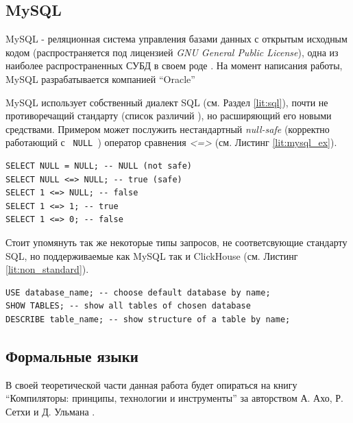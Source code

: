 \subsection{MySQL} \label{lit:mysql}
MySQL - реляционная система управления базами данных с открытым исходным кодом (распространяется под лицензией \textit{GNU General Public License}), одна из наиболее распространенных СУБД в своем роде \cite{mysql_ref}. На момент написания работы, MySQL разрабатывается компанией \enquote{Oracle} 

MySQL использует собственный диалект SQL (см. Раздел \ref{lit:sql}), почти не противоречащий стандарту (список различий \cite{mysql_vs_sql}\cite{mysql_vs_sql2}), но расширяющий его новыми средствами. Примером может послужить нестандартный \textit{null-safe} (корректно работающий с \texttt{ NULL }) оператор сравнения \textit{<=>} (см. Листинг \ref{lit:mysql_ex}).

\begin{code}
    \label{lit:mysql_ex}
    \begin{verbatim}
SELECT NULL = NULL; -- NULL (not safe)
SELECT NULL <=> NULL; -- true (safe)
SELECT 1 <=> NULL; -- false
SELECT 1 <=> 1; -- true
SELECT 1 <=> 0; -- false
    \end{verbatim}
\end{code}

Стоит упомянуть так же некоторые типы запросов, не соответсвующие стандарту SQL, но поддерживаемые как MySQL так и ClickHouse (см. Листинг \ref{lit:non_standard}).

\begin{code}
    \label{lit:non_standard}
    \begin{verbatim}
USE database_name; -- choose default database by name;
SHOW TABLES; -- show all tables of chosen database
DESCRIBE table_name; -- show structure of a table by name;
    \end{verbatim}
\end{code}


\subsection{Формальные языки}
В своей теоретической части данная работа будет опираться на книгу \enquote{Компиляторы: принципы, технологии и инструменты} за авторством А. Ахо, Р. Сетхи и Д. Ульмана \cite{dragon}.

